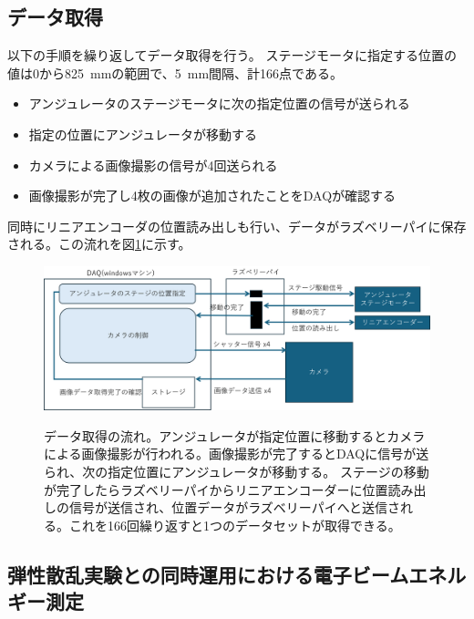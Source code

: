 \documentclass[a4paper,11pt,uplatex]{jsbook}
\begin{document}
\subsection{データ取得}\label{sec:DAQ}
以下の手順を繰り返してデータ取得を行う。
ステージモータに指定する位置の値は0から825~mmの範囲で、5~mm間隔、計166点である。
\begin{itemize}
  \item アンジュレータのステージモータに次の指定位置の信号が送られる
  \item 指定の位置にアンジュレータが移動する
  \item カメラによる画像撮影の信号が4回送られる
  \item 画像撮影が完了し4枚の画像が追加されたことをDAQが確認する
\end{itemize}
同時にリニアエンコーダの位置読み出しも行い、データがラズベリーパイに保存される。この流れを図\ref{DAQ}に示す。
\begin{figure}
  \centering
  \includegraphics[width=0.8\linewidth]{image/3-DAQ.png}\\
  \caption[データ取得の流れ]{データ取得の流れ。アンジュレータが指定位置に移動するとカメラによる画像撮影が行われる。画像撮影が完了するとDAQに信号が送られ、次の指定位置にアンジュレータが移動する。
  ステージの移動が完了したらラズベリーパイからリニアエンコーダーに位置読み出しの信号が送信され、位置データがラズベリーパイへと送信される。これを166回繰り返すと1つのデータセットが取得できる。}
  \label{DAQ}
\end{figure}
\subsection{弾性散乱実験との同時運用における電子ビームエネルギー測定}
\end{document}
